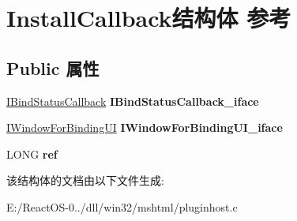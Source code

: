 \hypertarget{struct_install_callback}{}\section{Install\+Callback结构体 参考}
\label{struct_install_callback}
\subsection*{Public 属性}
\begin{DoxyCompactItemize}
\item 
\mbox{\label{struct_install_callback_a7cd62e145b422224fbd2dc80b9851ea2}} 
\hyperlink{interface_i_bind_status_callback}{I\+Bind\+Status\+Callback} {\bfseries I\+Bind\+Status\+Callback\+\_\+iface}
\item 
\mbox{\label{struct_install_callback_adf3e13cd3c63f73968ed0aeb6c44d634}} 
\hyperlink{interface_i_window_for_binding_u_i}{I\+Window\+For\+Binding\+UI} {\bfseries I\+Window\+For\+Binding\+U\+I\+\_\+iface}
\item 
\mbox{\label{struct_install_callback_a71aafe79b0bd352b3790f57eacbe459a}} 
L\+O\+NG {\bfseries ref}
\end{DoxyCompactItemize}


该结构体的文档由以下文件生成\+:\begin{DoxyCompactItemize}
\item 
E\+:/\+React\+O\+S-\/0../dll/win32/mshtml/pluginhost.\+c\end{DoxyCompactItemize}
